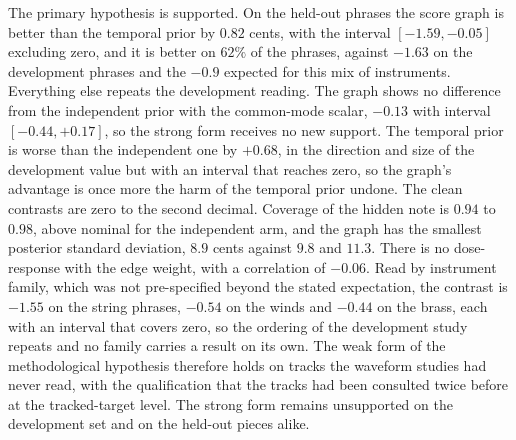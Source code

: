 The primary hypothesis is supported. On the held-out phrases the score graph
is better than the temporal prior by $0.82$ cents, with the interval
$[-1.59, -0.05]$ excluding zero, and it is better on $62\%$ of the
phrases, against $-1.63$ on the development phrases and the $-0.9$
expected for this mix of instruments. Everything else repeats the
development reading. The graph shows no difference from the independent
prior with the common-mode scalar, $-0.13$ with interval
$[-0.44, +0.17]$, so the strong form receives no new support. The
temporal prior is worse than the independent one by $+0.68$, in the
direction and size of the development value but with an interval that
reaches zero, so the graph's advantage is once more the harm of the
temporal prior undone. The clean contrasts are zero to the second decimal.
Coverage of the hidden note is $0.94$ to $0.98$, above nominal for the
independent arm, and the graph has the smallest posterior standard
deviation, $8.9$ cents against $9.8$ and $11.3$. There is no dose-response
with the edge weight, with a correlation of $-0.06$. Read by instrument
family, which was not pre-specified beyond the stated expectation, the
contrast is $-1.55$ on the string phrases, $-0.54$ on the winds and
$-0.44$ on the brass, each with an interval that covers zero, so the
ordering of the development study repeats and no family carries a result
on its own. The weak form of the methodological hypothesis therefore
holds on tracks the waveform studies had never read, with the
qualification that the tracks had been consulted twice before at the
tracked-target level. The strong form remains unsupported on the
development set and on the held-out pieces alike.

